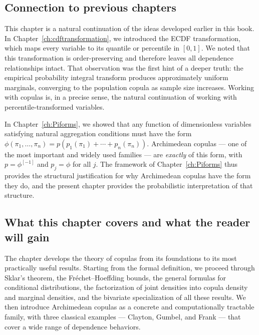 \subsection*{Connection to previous chapters}

This chapter is a natural continuation of the ideas developed earlier in this book.
In Chapter~\ref{ch:cdftransformation}, we introduced the ECDF transformation,
which maps every variable to its quantile or percentile in $[0,1]$. We noted that this
transformation is order-preserving and therefore leaves all dependence relationships
intact. That observation was the first hint of a deeper truth: the empirical probability integral transform produces approximately uniform marginals,
converging to the population copula as sample size increases. Working with copulas is, in a precise sense, the natural continuation of working
with percentile-transformed variables.

In Chapter~\ref{ch:Piforms}, we showed that any function of dimensionless variables
satisfying natural aggregation conditions must have the form
$\phi(\pi_1,\ldots,\pi_n) = p(p_1(\pi_1) + \cdots + p_n(\pi_n))$.
Archimedean copulas — one of the most important and widely used families — are
\emph{exactly} of this form, with $p = \phi^{[-1]}$ and $p_j = \phi$ for all $j$. The
framework of Chapter~\ref{ch:Piforms} thus provides the structural justification for
why Archimedean copulas have the form they do, and the present chapter provides the
probabilistic interpretation of that structure.

\subsection*{What this chapter covers and what the reader will gain}

The chapter develops the theory of copulas from its foundations to its most practically
useful results. Starting from the formal definition, we proceed through Sklar's theorem,
the Fréchet–Hoeffding bounds, the general formulas for conditional distributions, the
factorization of joint densities into copula density and marginal densities, and the
bivariate specialization of all these results. We then introduce Archimedean copulas as
a concrete and computationally tractable family, with three classical examples — Clayton,
Gumbel, and Frank — that cover a wide range of dependence behaviors.

